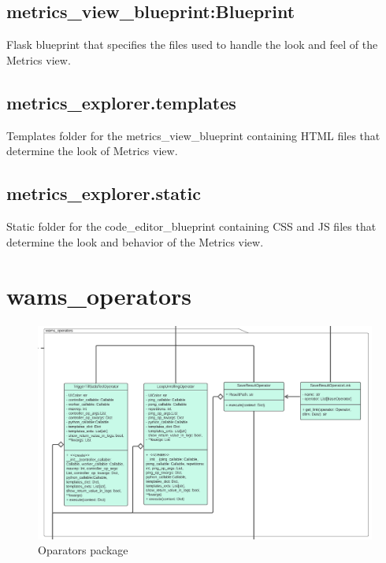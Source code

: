 
%

\subsection{metrics\_view\_blueprint:Blueprint}
Flask blueprint that specifies the files used to handle the look and feel of the Metrics view.

\subsection{metrics\_explorer.templates}
Templates folder for the metrics\_view\_blueprint containing HTML files that determine the look of Metrics view.


\subsection{metrics\_explorer.static}
Static folder for the code\_editor\_blueprint containing CSS and JS files that determine the look 
and behavior of the Metrics view.

\section{wams\_operators}
\begin{figure} [ht]
    \centering
    \includegraphics[width = \textwidth]{Diagramme/KlassendiagrammAusschnitte/Klassendiagramm -operators.png}
    \caption{Oparators package}
    \label{fig:operators section}
\end{figure}

